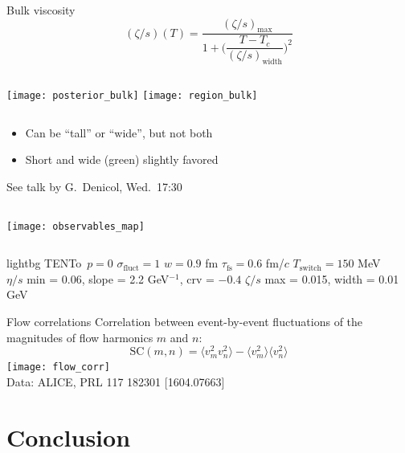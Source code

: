 \documentclass{beamer}
\newcommand{\fullwidth}[1]{
  \begin{columns}
    \column{\paperwidth}
    #1
  \end{columns}
}
\newcommand{\trento}{T\raisebox{-.5ex}{R}ENTo}
\newcommand{\zs}{(\zeta/s)}
\begin{document}
\begin{frame}{Bulk viscosity}
  \begin{equation*}
    \zs(T) = \frac{
      \zs_\text{max}
    }{
      1 + \biggl( \dfrac{T - T_c}{\zs_\text{width}} \biggr)^2
    }
  \end{equation*}
  \begin{columns}
    \texttt{[image: posterior\_bulk]}
    \texttt{[image: region\_bulk]}
  \end{columns}
  \begin{itemize}
    \item Can be ``tall'' or ``wide'', but not both
    \item Short and wide (green) slightly favored
  \end{itemize}
  \footnotesize\flushright See talk by G.~Denicol, Wed.~17:30
\end{frame}


\begin{frame}[plain,t]
  \fullwidth{
    \centering
    \texttt{[image: observables\_map]}
  }
  \bigskip
  \scriptsize
  \begin{beamercolorbox}[sep=1ex]{lightbg}
    \trento\ $p = 0$
    \hfill
    $\sigma_\text{fluct} = 1$
    \hfill
    $w = 0.9$ fm
    \hfill
    $\tau_\text{fs} = 0.6$ fm/$c$
    \hfill
    $T_\text{switch} = 150$ MeV
    \\[1ex]
    $\eta/s$ min = 0.06, \enskip slope = 2.2 GeV$^{-1}$, \enskip crv = $-0.4$
    \hfill
  $\zeta/s$ max = 0.015, \enskip width = 0.01 GeV
  \end{beamercolorbox}
\end{frame}

\begin{frame}{Flow correlations}
  Correlation between event-by-event fluctuations of the magnitudes of flow harmonics $m$ and $n$:
  \begin{equation*}
    \text{SC}(m, n) = \langle v_m^2 v_n^2 \rangle  - \langle v_m^2 \rangle \langle v_n^2 \rangle
  \end{equation*}
  \texttt{[image: flow\_corr]} \\
  \tiny\flushright Data: ALICE, PRL 117 182301 [1604.07663]
\end{frame}


\section{Conclusion}
\end{document}
